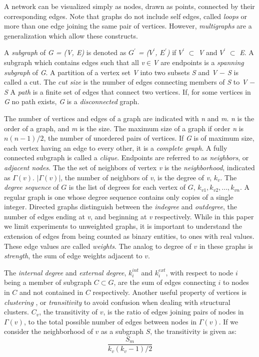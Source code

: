 A network can be visualized simply as nodes, drawn as points, connected by their corresponding edges. Note that graphs do not include self edges, called \textit{loops} or more than one edge joining the same pair of vertices. However, \textit{multigraphs} are a generalization which allow these constructs. 

A \textit{subgraph} of \textit{G = (V, E)} is denoted as \textit{$G^\prime$ = ($V^\prime$, $E^\prime$)} if \textit{$V^\prime$} $\subset$ \textit{V} and \textit{$V^\prime$} $\subset$ \textit{E}. A subgraph which contains edges such that all \textit{v}$\in$\textit{V} are endpoints is a \textit{spanning subgraph} of \textit{G}. 
A partition of a vertex set \textit{V} into two subsets \textit{S} and \textit{V $-$ S} is called a cut. The \textit{cut size} is the number of edges connecting members of \textit{S} to \textit{V $-$ S}
A \textit{path} is a finite set of edges that connect two vertices. If, for some vertices in \textit{G} no path exists, \textit{G} is a \textit{disconnected} graph.

The number of vertices and edges of a graph are indicated with \textit{n} and \textit{m}. \textit{n} is the order of a graph, and \textit{m} is the size. The maximum size of a graph if order \textit{n} is $n(n-1)/2$, the number of unordered pairs of vertices. If \textit{G} is of maximum size, each vertex having an edge to every other, it is a \textit{complete graph}. 
A fully connected subgraph is called a \textit{clique}. Endpoints are referred to as \textit{neighbors}, or \textit{adjacent nodes}. The the set of neighbors of vertex \textit{v} is the \textit{neighborhood}, indicated as \textit{$\Gamma(v)$}. $|\Gamma(v)|$, the number of neighbors of \textit{v}, is the degree of \textit{v}, $k_v$. The \textit{degree sequence} of $G$ is the list of degrees for each vertex of $G$, $k_{v1}, k_{v2},..., k_{vn}$. 
A regular graph is one whose degree sequence contains only copies of a single integer. Directed graphs distinguish between the \textit{indegree} and \textit{outdegree}, the number of edges ending at \textit{v}, and beginning at \textit{v} respectively. While in this paper we limit experiments to unweighted graphs, it is important to understand the extension of edges from being counted as binary entities, to ones with real values. These edge values are called \textit{weights}. The analog to degree of $v$ in these graphs is \textit{strength}, the sum of edge weights adjacent to $v$.

The \textit{internal degree} and \textit{external degree}, $k^{int}_i$ and $k^{ext}_i$, with respect to node $i$ being a member of subgraph $C\subset G$, are the sum of edges connecting $i$ to nodes in $C$ and not contained in $C$ respectively. 
Another useful property of vertices is \textit{clustering} \cite{Watts1998}, or \textit{transitivity} to avoid confusion when dealing with structural clusters. $C_v$, the transitivity of $v$, is the ratio of edges joining pairs of nodes in $\Gamma(v)$, to the total possible number of edges between nodes in $\Gamma(v)$. If we consider the neighborhood of $v$ as a subgraph $S$, the transitivity is given as: $$\dfrac{S_m}{k_v(k_v-1)/2}$$

